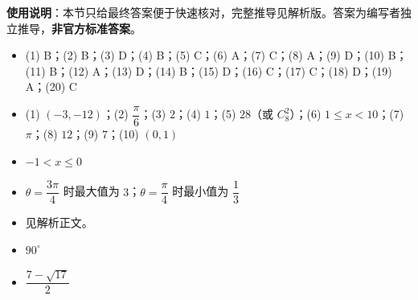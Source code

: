 
\begin{gknotice}
\textbf{使用说明}：本节只给最终答案便于快速核对，完整推导见解析版。答案为编写者独立推导，\textbf{非官方标准答案}。
\end{gknotice}

\begin{itemize}[leftmargin=2.6em]
  \item[\textbf{1.}] (1) B；(2) B；(3) D；(4) B；(5) C；(6) A；(7) C；(8) A；(9) D；(10) B；(11) B；(12) A；(13) D；(14) B；(15) D；(16) C；(17) C；(18) D；(19) A；(20) C
  \item[\textbf{2.}] (1) $(-3,-12)$；(2) $\dfrac\pi6$；(3) $2$；(4) $1$；(5) $28$（或 $C_8^2$）；(6) $1\le x<10$；(7) $\pi$；(8) $12$；(9) $7$；(10) $(0,1)$
  \item[\textbf{3.}] $-1<x\le0$
  \item[\textbf{4.}] $\theta=\dfrac{3\pi}4$ 时最大值为 $3$；$\theta=\dfrac\pi4$ 时最小值为 $\dfrac13$
  \item[\textbf{5.}] 见解析正文。
  \item[\textbf{6.}] $90^\circ$
  \item[\textbf{7.}] $\dfrac{7-\sqrt{17}}2$
\end{itemize}
